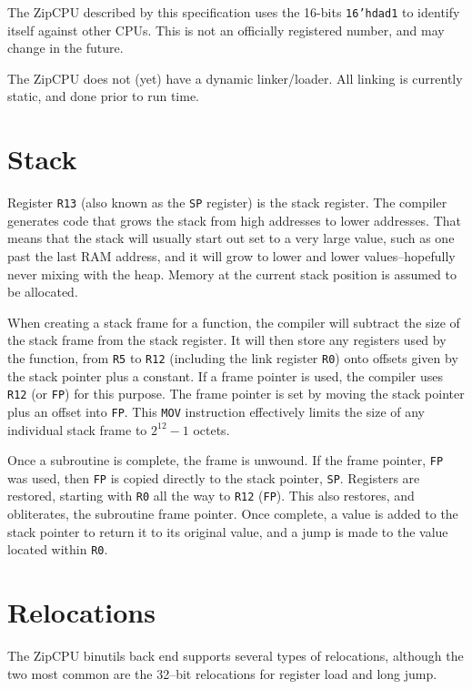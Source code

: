 \documentclass{gqtekspec}
\begin{document}
The ZipCPU described by this specification uses the 16-bits {\tt 16'hdad1}
to identify itself against other CPUs.  This is not an officially registered
number, and may change in the future.

The ZipCPU does not (yet) have a dynamic linker/loader.  All linking is
currently static, and done prior to run time.

\section{Stack}\label{sec:abi-stack}
Register {\tt R13} (also known as the {\tt SP} register) is the stack register.
The compiler generates code that grows the stack from
high addresses to lower addresses.  That means that the stack will usually
start out set to a very large value, such as one past the last RAM address,
and it will grow to lower and lower values--hopefully never mixing with the
heap.  Memory at the current stack position is assumed to be allocated.

When creating a stack frame for a function, the compiler will subtract
the size of the stack frame from the stack register.  It will then store
any registers used by the function, from {\tt R5} to {\tt R12} (including
the link register {\tt R0}) onto offsets given by the stack pointer plus a 
constant.  If a frame pointer is used, the compiler uses {\tt R12} (or
{\tt FP}) for this purpose.  The frame pointer is set by moving the stack
pointer plus an offset into {\tt FP}.  This {\tt MOV} instruction effectively
limits the size of any individual stack frame to $2^{12}-1$ octets.

Once a subroutine is complete, the frame is unwound.  If the frame pointer,
{\tt FP} was used, then {\tt FP} is copied directly to the stack pointer,
{\tt SP}.  Registers are restored, starting with {\tt R0} all the way to
{\tt R12} ({\tt FP}).  This also restores, and obliterates, the subroutine
frame pointer.  Once complete, a value is added to the stack pointer to
return it to its original value, and a jump is made to the value located
within {\tt R0}.

\section{Relocations}\label{sec:abi-reloc}

The ZipCPU binutils back end supports several types of relocations, although
the two most common are the 32--bit relocations for register load and long
jump.
\end{document}
